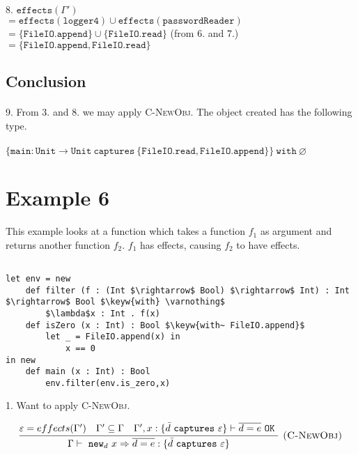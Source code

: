 \documentclass{llncs}
\newcommand{\keywadj}[1]{\mathtt{#1}}
\newcommand{\keyw}[1]{\keywadj{#1}~}
\begin{document}
\paragraph{}
8. $\keywadj{effects(\Gamma')}$\\
$\keywadj{= effects(logger4) \cup effects(passwordReader)}$\\
$\keywadj{= \{ FileIO.append \} \cup \{ FileIO.read \}}$ (from 6. and 7.)\\
$\keywadj{= \{ FileIO.append, FileIO.read \}}$

\subsection*{Conclusion}

\paragraph{}
9. From 3. and 8. we may apply \textsc{C-NewObj}. The object created has the following type.

\paragraph{}
$\keywadj{ \{ main : Unit \rightarrow Unit~captures~\{FileIO.read, FileIO.append\} \}~with~\varnothing }$

\section{Example 6}

This example looks at a function which takes a function $f_1$ as argument and returns another function $f_2$. $f_1$ has effects, causing $f_2$ to have effects.


\vspace{-6pt}
\begin{lstlisting}[xleftmargin=20pt]

let env = new
    def filter (f : (Int $\rightarrow$ Bool) $\rightarrow$ Int) : Int $\rightarrow$ Bool $\keyw{with} \varnothing$
        $\lambda$x : Int . f(x)
    def isZero (x : Int) : Bool $\keyw{with~ FileIO.append}$
        let _ = FileIO.append(x) in
            x == 0
in new
    def main (x : Int) : Bool
        env.filter(env.is_zero,x)

\end{lstlisting}

1. Want to apply \textsc{C-NewObj}.

\[
\begin{array}{c}
\infer[\textsc{(C-NewObj)}]
	{\Gamma \vdash~\keywadj{new}_d~x \Rightarrow \overline{d = e} : \{  \bar d~\keyw{captures} \varepsilon \} }
	{\varepsilon = effects(\Gamma') & \Gamma' \subseteq \Gamma & \Gamma', x : \{ \bar d~\keyw {captures} \varepsilon \} \vdash \overline{d = e}~\keyw{OK}} \\
\end{array}
\]
\end{document}
